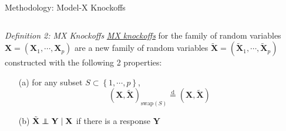     \begin{frame}{Methodology: Model-X Knockoffs}
        \begin{columns}
            \begin{column}{0.95\textwidth}
                \small
                \begin{block}{\textit{Definition 2: MX Knockoffs}}
                    \underline{\textit{MX knockoffs}} for the family of random variables $\mathbf{X}=(\mathbf{X}_1,\cdots,\mathbf{X}_p)$ are a new family of random variables $\tilde{\mathbf{X}} = (\tilde{\mathbf{X}}_1,\cdots,\tilde{\mathbf{X}}_p)$ constructed with the following 2 properties:
                    \begin{itemize}
                        \item[(a)] for any subset $S \subset \left\{1,\cdots,p \right\}$, $$ (\mathbf{X},\tilde{\mathbf{X}})_{\mathrm{swap}(S)} \overset{\mathrm{d}}{=}(\mathbf{X},\tilde{\mathbf{X}}) $$
                        \item[(b)] $\tilde{\mathbf{X}}\perp\!\!\!\!\perp \mathbf{Y}\mid \mathbf{X}$ if there is a response $\mathbf{Y}$
                    \end{itemize}
                \end{block}
            \end{column}
        \end{columns}

        \vspace*{10pt}
    \end{frame}

